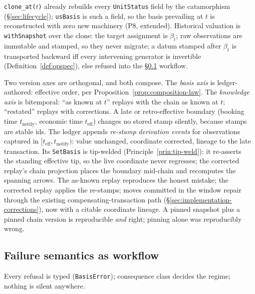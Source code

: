 \documentclass[11pt,a4paper]{article}
\begin{document}
\texttt{clone\_at($t$)} already rebuilds every \texttt{UnitStatus} field by the
catamorphism (\S\ref{sec:lifecycle}); \texttt{usBasis} is such a field, so the basis
prevailing at $t$ is reconstructed with zero new machinery (P8, extended). Historical
valuation is \texttt{withSnapshot} over the clone: the target assignment is $\beta_t$;
raw observations are immutable and stamped, so they never migrate; a datum stamped after
$\beta_t$ is transported backward iff every intervening generator is invertible
(Definition~\ref{def:opspec}), else refused into the \S\ref{sec:basis-failure} workflow.

Two version axes are orthogonal, and both compose. The \emph{basis axis} is
ledger-authored: effective order, per Proposition~\ref{prop:composition-law}. The
\emph{knowledge axis} is bitemporal: ``as known at $t$'' replays with the chain as known
at $t$; ``restated'' replays with corrections. A late or retro-effective boundary
(booking time $t_{\mathrm{notify}}$, economic time $t_{\mathrm{eff}}$) changes no stored
stamp silently, because stamps are stable ids. The ledger appends \emph{re-stamp derivation
events} for observations captured in $[t_{\mathrm{eff}},t_{\mathrm{notify}})$: value
unchanged, coordinate corrected, lineage to the late transaction. Its \texttt{SetBasis}
is tip-welded (Principle~\ref{prin:tip-weld}): it re-asserts the standing effective tip,
so the live coordinate never regresses; the corrected replay's chain projection places
the boundary mid-chain and recomputes the spanning arrows. The as-known replay
reproduces the honest mistake; the corrected replay applies the re-stamps; moves
committed in the window repair through the existing compensating-transaction path
(\S\ref{sec:implementation-corrections}), now with a citable coordinate lineage. A pinned
snapshot plus a pinned chain version is reproducible \emph{and} right; pinning alone was
reproducibly wrong.

\subsection{Failure semantics as workflow}
\label{sec:basis-failure}

Every refusal is typed (\texttt{BasisError}); consequence class decides the regime;
nothing is silent anywhere.
\end{document}
